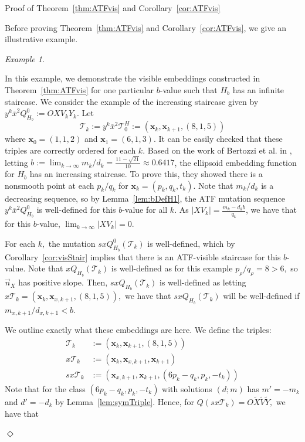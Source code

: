 \documentclass[11pt, reqno]{amsart}
\makeatletter
\def\subsection{\@startsection{subsection}{2}%
  \z@{.5\linespacing\@plus.7\linespacing}{-.5em}%
  {\normalfont\large\bfseries}}
\theoremstyle{remark}
\numberwithin{equation}{subsection}
\numberwithin{figure}{section}
\theoremstyle{customremark}
\newtheorem{example_no_diamond}[thm]{Example}
\newenvironment{example}{\begin{example_no_diamond} } {\hfill$\er$ \end{example_no_diamond}}
\newcommand{\Tt}{\mathcal{T}}
\newcommand{\vn}{{\vec{n}}}
\newcommand{\ov}{\overline}
\newcommand{\er}{{\Diamond}}
\makeatother
\begin{document}
\subsection{Proof of Theorem~\ref{thm:ATFvis} and Corollary~\ref{cor:ATFvis}}


Before proving Theorem~\ref{thm:ATFvis} and Corollary~\ref{cor:ATFvis}, we give an illustrative example. 
\begin{example} \label{ex:visStair}

In this example, we demonstrate the visible embeddings constructed in Theorem~\ref{thm:ATFvis} for one particular $b$-value such that $H_b$ has an infinite staircase. 
We consider the example of the increasing staircase given by $y^k\ov{x}^2Q_{H_b}^0:=OXV_kY_k$. Let 
\[ \Tt_k:=y^{k}\ov{x}^2\Tt_0^H:=(\bm{x}_k,\bm{x}_{k+1},(8,1,5))\]
where $\bm{x}_0=(1, 1, 2)$ and $\bm{x}_1=(6,1,3).$ It can be easily checked that these triples are correctly ordered for each $k$. Based on the work of Bertozzi et al. in \cite{ICERM}, letting $b:=\lim_{k \to \infty} m_k/d_k=\frac{11-\sqrt{21}}{10} \approx 0.6417$, the ellipsoid embedding function for $H_b$ has an increasing staircase. To prove this, they showed there is a nonsmooth point at each $p_k/q_k$ for $\bm{x}_k=(p_k,q_k,t_k).$ Note that $m_k/d_k$ is a decreasing sequence, so by Lemma~\ref{lem:bDefH1}, the ATF mutation sequence $y^k\ov{x}^2Q_{H_b}^0$ is well-defined for this $b$-value for all $k$.  As $|XV_k|=\frac{m_{k}-d_{k}b}{q_{k}}$, we have that for this $b$-value, $\lim_{k \to \infty} |XV_k|=0$. 

For each $k,$ the mutation $sxQ_{H_b}^0(\Tt_k)$ is well-defined, which by Corollary~\ref{cor:visStair} implies that there is an ATF-visible staircase for this $b$-value. Note that $xQ_{H_b}(\Tt_k)$ is well-defined as for this example $p_\rho/q_\rho=8>6,$ so $\vn_X$ has positive slope. Then, $sxQ_{H_b}(\Tt_k)$ is well-defined as letting $x\Tt_k=(\bm{x}_k,\bm{x}_{x,k+1},(8,1,5)),$ we have that $sxQ_{H_b}(\Tt_k)$ will be well-defined if $m_{x,k+1}/d_{x,k+1}<b$. 

We outline exactly what these embeddings are here. We define the triples: 
\begin{align*}
	\Tt_k&:=(\bm{x}_k,\bm{x}_{k+1},(8,1,5)) \\
	x\Tt_k&:=(\bm{x}_k,\bm{x}_{x,k+1},\bm{x}_{k+1}) \\
	sx\Tt_k&:=(\bm{x}_{x,k+1},\bm{x}_{k+1},(6p_k-q_k,p_k,-t_k)) 
\end{align*} 
Note that for the class $(6p_k-q_k,p_k,-t_k)$ with solutions $(d;m)$ has $m'=-m_k$ and $d'=-d_k$ by Lemma~\ref{lem:symTriple}. Hence, for 
$Q(sx\Tt_k)=O\tilde{X}\tilde{V}\tilde{Y},$ we have that 


\end{example}
\end{document}
